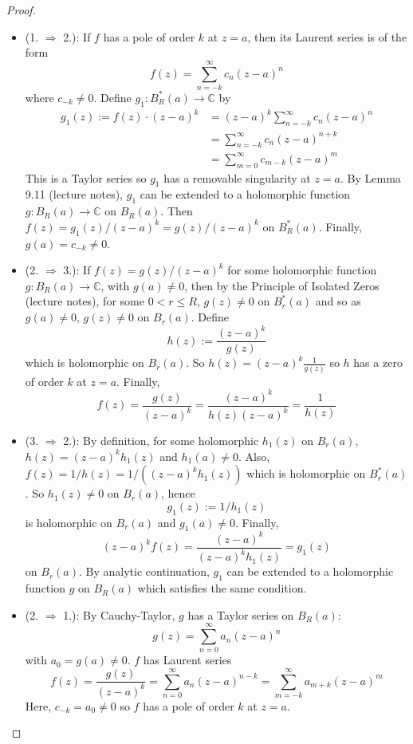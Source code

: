 \begin{proof}
	\hfill
	\begin{itemize}
		\item (1. $\Rightarrow$ 2.): If $f$ has a pole of order $k$ at $z = a$, then its Laurent series is of the form
		\[
			f(z) = \sum_{n = -k}^{\infty} c_n {(z - a)}^n
		\]
		where $c_{-k} \ne 0$. Define $g_1: B_R^*(a) \rightarrow \mathbb{C}$ by
		\[
			\begin{aligned}
				g_1(z) := f(z) \cdot {(z - a)}^k
					& = {(z - a)}^k \sum_{n = -k}^{\infty} c_n {(z - a)}^n \\
					& = \sum_{n = -k}^{\infty} c_n {(z - a)}^{n + k} \\
					& = \sum_{m = 0}^{\infty} c_{m - k} {(z - a)}^m
			\end{aligned}
		\]
		This is a Taylor series so $g_1$ has a removable singularity at $z = a$. By Lemma 9.11 (lecture notes), $g_1$ can be extended to a holomorphic function $g: B_R(a) \rightarrow \mathbb{C}$ on $B_R(a)$. Then $f(z) = g_1(z) / {(z - a)}^k = g(z) / {(z - a)}^k$ on $B_R^*(a)$. Finally, $g(a) = c_{-k} \ne 0$.
	
		\item (2. $\Rightarrow$ 3.): If $f(z) = g(z) / {(z - a)}^k$ for some holomorphic function $g: B_R(a) \rightarrow \mathbb{C}$, with $g(a) \ne 0$, then by the Principle of Isolated Zeros (lecture notes), for some $0 < r \le R$, $g(z) \ne 0$ on $B_r^*(a)$ and so as $g(a) \ne 0$, $g(z) \ne 0$ on $B_r(a)$. Define
		\[
			h(z) := \frac{{(z - a)}^k}{g(z)}
		\]
		which is holomorphic on $B_r(a)$. So $h(z) = {(z - a)}^k \frac{1}{g(z)}$ so $h$ has a zero of order $k$ at $z = a$. Finally,
		\[
			f(z) = \frac{g(z)}{{(z - a)}^k} = \frac{{(z - a)}^k}{h(z) {(z - a)}^k} = \frac{1}{h(z)}
		\]
		\item (3. $\Rightarrow$ 2.): By definition, for some holomorphic $h_1(z)$ on $B_r(a)$, $h(z) = {(z - a)}^k h_1(z)$ and $h_1(a) \ne 0$. Also, $f(z) = 1 / h(z) = 1 / ({(z - a)}^k h_1(z))$ which is holomorphic on $B_r^*(a)$. So $h_1(z) \ne 0$ on $B_r(a)$, hence
		\[
			g_1(z) := 1 / h_1(z)
		\]
		is holomorphic on $B_r(a)$ and $g_1(a) \ne 0$. Finally,
		\[
			{(z - a)}^k f(z) = \frac{{(z - a)}^k}{{(z - a)}^k h_1(z)} = g_1(z)
		\]
		on $B_r(a)$. By analytic continuation, $g_1$ can be extended to a holomorphic function $g$ on $B_R(a)$ which satisfies the same condition.
		\item (2. $\Rightarrow$ 1.): By Cauchy-Taylor, $g$ has a Taylor series on $B_R(a)$:
		\[
			g(z) = \sum_{n = 0}^{\infty} a_n {(z - a)}^n
		\]
		with $a_0 = g(a) \ne 0$. $f$ has Laurent series
		\[
			f(z) = \frac{g(z)}{{(z - a)}^k} = \sum_{n = 0}^{\infty} a_n {(z - a)}^{n - k} = \sum_{m = -k}^{\infty} a_{m + k} {(z - a)}^m
		\]
		Here, $c_{-k} = a_0 \ne 0$ so $f$ has a pole of order $k$ at $z = a$.
	\end{itemize}
\end{proof}

